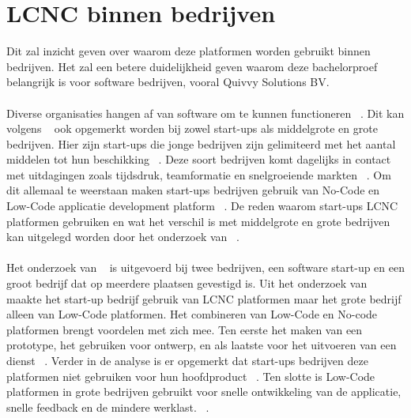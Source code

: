 \section{LCNC binnen bedrijven}
\label{sec:lcnc-bedrijven}
Dit zal inzicht geven over waarom deze platformen worden gebruikt binnen bedrijven. 
Het zal een betere duidelijkheid geven waarom deze bachelorproef belangrijk is voor software bedrijven, vooral Quivvy Solutions BV.
\\
\\
Diverse organisaties hangen af van software om te kunnen functioneren ~\autocite{Hintsch2021}. 
Dit kan volgens ~\textcite{Rafiq_2022} ook opgemerkt worden bij zowel start-ups als middelgrote en grote bedrijven. Hier zijn start-ups die jonge bedrijven 
zijn gelimiteerd met het aantal middelen tot hun beschikking ~\autocite{Rafiq_2022}. Deze soort bedrijven komt dagelijks in contact met uitdagingen zoals tijdsdruk, 
teamformatie en snelgroeiende markten ~\autocite{Rafiq_2022}. Om dit allemaal te weerstaan maken start-ups bedrijven gebruik van No-Code en Low-Code applicatie 
development platform ~\autocite{Rafiq_2022}. De reden waarom start-ups LCNC platformen gebruiken en wat het verschil is met middelgrote en grote bedrijven kan 
uitgelegd worden door het onderzoek van ~\textcite{Rafiq_2022}.\\\\ Het onderzoek van ~\textcite{Rafiq_2022} is uitgevoerd bij twee bedrijven, een software start-up en 
een groot bedrijf dat op meerdere plaatsen gevestigd is. Uit het onderzoek van ~\textcite{Rafiq_2022} maakte het start-up bedrijf gebruik van LCNC platformen maar 
het grote bedrijf alleen van Low-Code platformen. Het combineren van Low-Code en No-code platformen brengt voordelen met zich mee. Ten eerste het maken 
van een prototype, het gebruiken voor ontwerp, en als laatste voor het uitvoeren van een dienst ~\autocite{Rafiq_2022}. Verder in de analyse is er opgemerkt dat start-ups 
bedrijven deze platformen niet gebruiken voor hun hoofdproduct ~\autocite{Rafiq_2022}. Ten slotte is Low-Code platformen in grote bedrijven gebruikt voor snelle ontwikkeling 
van de applicatie, snelle feedback en de mindere werklast. ~\autocite{Rafiq_2022}.
